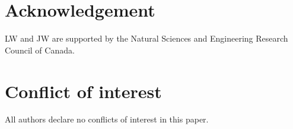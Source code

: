 \documentclass{CMHPhD-SIVD}
\begin{document}
\section*{Acknowledgement}
LW and JW are supported by the Natural Sciences and Engineering Research Council of Canada.
\section*{Conflict of interest}
All authors declare no conflicts of interest in this paper.


\end{document}
